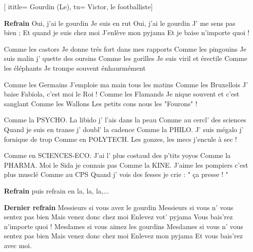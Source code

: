  [
ititle= {Gourdin (Le)},
tu= {Victor, le footballiste}]


\beginchorus
\textbf {Refrain}
Oui, j'ai le gourdin
Je suis en rut
Oui, j'ai le gourdin
J' me sens pas bien ;
Et quand je suis chez moi
J'enlève mon pyjama
Et je baise n'importe quoi !
\endchorus

\beginverse
Comme les castors
Je donne trés fort dans mes rapports
Comme les pingouins
Je suis malin j' quette des oursins
Comme les gorilles
Je suis viril et érectile
Comme les éléphants
Je trompe souvent énhaurmément
\endverse

\beginverse
Comme les Germains
J'emploie ma main tous les matins
Comme les Bruxellois
J' baise Fabiola, c'est moi le Roi !
Comme les Flamands
Je nique souvent et c'est sanglant
Comme les Wallons
Les petits cons nous les "Fourons" !
\endverse

\beginverse
Comme la PSYCHO.
La libido j' l'ais dans la peau
Comme au cercl' des sciences
Quand je suis en transe j' doubl' la cadence
Comme la PHILO.
J' suis mégalo j' fornique de trop
Comme en POLYTECH.
Les gonzes, les mecs j'encule à sec !
\endverse

\beginverse
Comme en SCIENCES-ECO.
J'ai l' plus costaud des p'tits yoyos
Comme la PHARMA.
Moi le Sida je connais pas
Comme la KINE.
J'aime les pompiers c'est plus musclé
Comme au CPS
Quand j' vois des fesses je crie : " ça presse ! "
\endverse

\beginverse
\textbf {Refrain} puis refrain en la, la, la,...
\endverse

\beginchorus
\textbf {Dernier refrain}
Messieurs si vous avez le gourdin
Messieurs si vous n' vous sentez pas bien
Mais venez donc chez moi
Enlevez vot' pyjama
Vous bais'rez n'importe quoi !
Mesdames si vous aimez les gourdins
Mesdames si vous n' vous sentez pas bien
Mais venez donc chez moi
Enlevez mon pyjama
Et vous bais'rez avec moi.
\endchorus

\endsong

